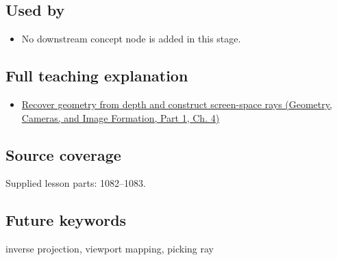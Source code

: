 \subsection{Used by}\label{appendix-f1a6d43e80d1-used-by}

\hypertarget{appendix-f1a6d43e80d1-used-by}{}

\begin{itemize}
\tightlist
\item
  No downstream concept node is added in this stage.
\end{itemize}

\subsection{Full teaching explanation}\label{appendix-f1a6d43e80d1-full-teaching-explanation}

\hypertarget{appendix-f1a6d43e80d1-full-teaching-explanation}{}

\begin{itemize}
\tightlist
\item
  \href{../03-Geometry-Cameras-and-Image-Formation-P01/main.pdf\#02-foundations-ii-ch035-recover-geometry-from-depth-and-construct-screen-space-rays}{Recover geometry from depth and construct screen-space rays (Geometry, Cameras, and Image Formation, Part 1, Ch. 4)}
\end{itemize}

\subsection{Source coverage}\label{appendix-f1a6d43e80d1-source-coverage}

\hypertarget{appendix-f1a6d43e80d1-source-coverage}{}

Supplied lesson parts: 1082--1083.

\subsection{Future keywords}\label{appendix-f1a6d43e80d1-future-keywords}

\hypertarget{appendix-f1a6d43e80d1-future-keywords}{}

inverse projection, viewport mapping, picking ray

